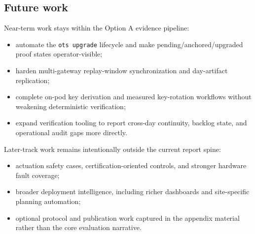 \subsection{Future work}\label{subsec:future-work}
Near-term work stays within the Option A evidence pipeline:
\begin{itemize}[nosep]
  \item automate the \texttt{ots upgrade} lifecycle and make pending/anchored/upgraded proof states operator-visible;
  \item harden multi-gateway replay-window synchronization and day-artifact replication;
  \item complete on-pod key derivation and measured key-rotation workflows without weakening deterministic verification;
  \item expand verification tooling to report cross-day continuity, backlog state, and operational audit gaps more directly.
\end{itemize}

Later-track work remains intentionally outside the current report spine:
\begin{itemize}[nosep]
  \item actuation safety cases, certification-oriented controls, and stronger hardware fault coverage;
  \item broader deployment intelligence, including richer dashboards and site-specific planning automation;
  \item optional protocol and publication work captured in the appendix material rather than the core evaluation narrative.
\end{itemize}


